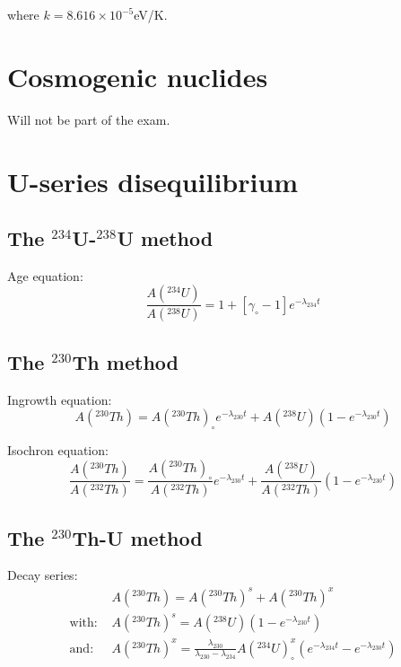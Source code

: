 \documentclass{article}
\begin{document}
\begin{multicols}{3}
where $k=8.616\times{10}^{-5}$eV/K.

\section[Cosmogenic Nuclides]{Cosmogenic nuclides}
\label{sec:cosmo}

Will not be part of the exam.

\section[U-series dating]{U-series disequilibrium}
\label{ch:intro2Useries}

\subsection{The $^{234}$U-$^{238}$U method}
\label{sec:234238}

Age equation:
\begin{equation}
\frac{A(^{234}U)}{A(^{238}U)} = 1 + [ \gamma_\circ - 1 ] e^{-\lambda_{234}t} 
\label{eq:A234A238}
\end{equation}

\subsection{The $^{230}$Th method}
\label{sec:230}

Ingrowth equation:
\begin{equation}
A(^{230}Th) = A(^{230}Th)_\circ e^{-\lambda_{230}t} + A(^{238}U)(1-e^{-\lambda_{230}t})
\label{eq:A230}
\end{equation}

Isochron equation:
\begin{equation}
  \frac{A(^{230}Th)}{A(^{232}Th)} =
  \frac{A(^{230}Th)_\circ}{A(^{232}Th)} e^{-\lambda_{230}t} + 
  \frac{A(^{238}U)}{A(^{232}Th)}(1-e^{-\lambda_{230}t})
\label{eq:230232}
\end{equation}

\subsection{The $^{230}$Th-U method}
\label{sec:230238}

Decay series:
\begin{align}
~ & A(^{230}Th) =  A(^{230}Th)^s + A(^{230}Th)^x \label{eq:230total}\\
\mbox{with:~} & A(^{230}Th)^s = A(^{238}U) (1-e^{-\lambda_{230}t}) \label{eq:230s}\\
\mbox{and:~} & A(^{230}Th)^x = \frac{\lambda_{230}}{\lambda_{230}-\lambda_{234}} 
A(^{234}U)_\circ^x\left(e^{-\lambda_{234}t}-e^{-\lambda_{230}t}\right) \label{eq:230x}
\end{align}


\end{multicols}
\end{document}

